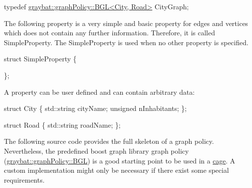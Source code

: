 \begin{DoxyCode}
\textcolor{keyword}{typedef} \hyperlink{classgraybat_1_1graphPolicy_1_1BGL}{graybat::graphPolicy::BGL<City, Road>} CityGraph;
\end{DoxyCode}


The following property is a very simple and basic property for edges and vertices which does not contain any further information. Therefore, it is called Simple\+Property. The Simple\+Property is used when no other property is specified.


\begin{DoxyCode}
\textcolor{keyword}{struct }SimpleProperty \{

\};
\end{DoxyCode}


A property can be user defined and can contain arbitrary data\+:


\begin{DoxyCode}
\textcolor{keyword}{struct }City \{
    std::string cityName;
    \textcolor{keywordtype}{unsigned} nInhabitants;
\};

\textcolor{keyword}{struct }Road \{
    std::string roadName;
\};
\end{DoxyCode}


The following source code provides the full skeleton of a graph policy. Nevertheless, the predefined boost graph library graph policy (\hyperlink{classgraybat_1_1graphPolicy_1_1BGL}{graybat\+::graph\+Policy\+::\+B\+G\+L}) is a good starting point to be used in a \hyperlink{cage}{cage}. A custom implementation might only be necessary if there exist some special requirements.


